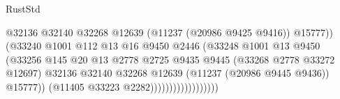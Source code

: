 \begin{lexlean}{RustStd}
\begin{coremodule}
                                                                  @32136
                                                                  @32140
                                                                  @32268
                                                                  @12639
                                                                  (@11237 (@20986 @9425 @9416))
                                                                  @15777))
                                                              (@33240
                                                                @1001
                                                                @112
                                                                @13
                                                                @16
                                                                @9450
                                                                @2446
                                                                (@33248
                                                                  @1001
                                                                  @13
                                                                  @9450
                                                                  (@33256
                                                                    @145
                                                                    @20
                                                                    @13
                                                                    @2778
                                                                    @2725
                                                                    @9435
                                                                    @9445
                                                                    (@33268 @2778 @33272 @12697)
                                                                    @32136
                                                                    @32140
                                                                    @32268
                                                                    @12639
                                                                    (@11237 (@20986 @9445 @9436))
                                                                    @15777))
                                                                (@11405
                                                                  @33223
                                                                  @2282))))))))))))))))))

\end{coremodule}
\end{lexlean}
